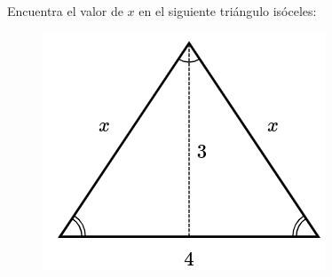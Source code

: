 Encuentra el valor de $x$ en el siguiente triángulo isóceles:

\begin{figure}[H]
    \centering
    \includegraphics[width=0.3\linewidth]{../images/pitagoras14.png}
    \caption{}
    \label{fig:pitagoras14}
\end{figure}
